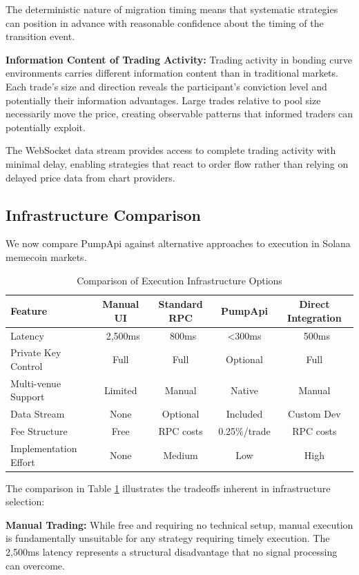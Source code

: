 \documentclass[12pt,a4paper]{article}
\begin{document}
The deterministic nature of migration timing means that systematic strategies can position in advance with reasonable confidence about the timing of the transition event.

\textbf{Information Content of Trading Activity:} Trading activity in bonding curve environments carries different information content than in traditional markets. Each trade's size and direction reveals the participant's conviction level and potentially their information advantages. Large trades relative to pool size necessarily move the price, creating observable patterns that informed traders can potentially exploit.

The WebSocket data stream provides access to complete trading activity with minimal delay, enabling strategies that react to order flow rather than relying on delayed price data from chart providers.

\subsection{Infrastructure Comparison}

We now compare PumpApi against alternative approaches to execution in Solana memecoin markets.

\begin{table}[htbp]
\centering
\caption{Comparison of Execution Infrastructure Options}
\label{tab:infrastructure-comparison}
\begin{tabular}{@{}lcccc@{}}
\toprule
Feature & Manual UI & Standard RPC & PumpApi & Direct Integration \\
\midrule
Latency & ~2,500ms & ~800ms & <300ms & ~500ms \\
Private Key Control & Full & Full & Optional & Full \\
Multi-venue Support & Limited & Manual & Native & Manual \\
Data Stream & None & Optional & Included & Custom Dev \\
Fee Structure & Free & RPC costs & 0.25\%/trade & RPC costs \\
Implementation Effort & None & Medium & Low & High \\
\bottomrule
\end{tabular}
\end{table}

The comparison in Table \ref{tab:infrastructure-comparison} illustrates the tradeoffs inherent in infrastructure selection:

\textbf{Manual Trading:} While free and requiring no technical setup, manual execution is fundamentally unsuitable for any strategy requiring timely execution. The 2,500ms latency represents a structural disadvantage that no signal processing can overcome.
\end{document}
